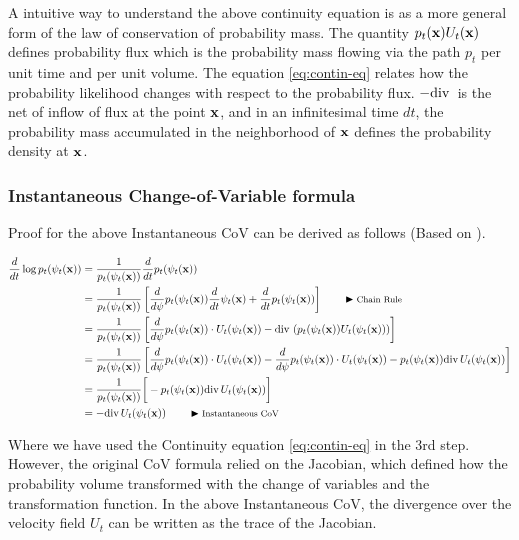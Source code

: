 \documentclass[a4paper, 11pt]{article}
\begin{document}
A intuitive way to understand the above continuity equation is as a more general form of the law of conservation of probability mass. The quantity $p_t(\mbox{$\mbox{$\mathbf{x}$}$})U_t(\mbox{$\mbox{$\mathbf{x}$}$})$ defines probability flux which is the probability mass flowing via the path $p_t$ per unit time and per unit volume. The equation \eqref{eq:contin-eq} relates how the probability likelihood changes with respect to the probability flux. $- \text{div}\,$ is the net of inflow of flux at the point $\mbox{$\mbox{$\mathbf{x}$}$}$, and in an infinitesimal time $dt$, the probability mass accumulated in the neighborhood of $\mbox{$\mbox{$\mathbf{x}$}$}$ defines the probability density at $\mbox{$\mbox{$\mathbf{x}$}$}$.
 

\subsubsection{Instantaneous Change-of-Variable formula}

Proof for the above Instantaneous CoV can be derived as follows (Based on \cite{mathieu2020riemannian}).

\begin{align}
    \frac{d}{dt} \log p_t(\psi_t(\mbox{$\mbox{$\mathbf{x}$}$})) &=  \frac{1}{p_t(\psi_t(\mbox{$\mbox{$\mathbf{x}$}$}))}\frac{d}{dt}p_t(\psi_t(\mbox{$\mbox{$\mathbf{x}$}$})) \\
    &=  \frac{1}{p_t(\psi_t(\mbox{$\mbox{$\mathbf{x}$}$}))}\left [\frac{d}{d\psi}p_t(\psi_t(\mbox{$\mbox{$\mathbf{x}$}$})) \frac{d}{dt}\psi_t(\mbox{$\mbox{$\mathbf{x}$}$}) + \frac{d}{dt}p_t(\psi_t(\mbox{$\mbox{$\mathbf{x}$}$})) \right ]  \qquad \blacktriangleright\text{\footnotesize Chain Rule} \\
    &= \frac{1}{p_t(\psi_t(\mbox{$\mbox{$\mathbf{x}$}$}))} \left [\frac{d}{d\psi}p_t(\psi_t(\mbox{$\mbox{$\mathbf{x}$}$})) \cdot U_t(\psi_t(\mbox{$\mbox{$\mathbf{x}$}$})) - \text{div}\, \left (p_t(\psi_t(\mbox{$\mbox{$\mathbf{x}$}$})) U_t(\psi_t(\mbox{$\mbox{$\mathbf{x}$}$})) \right ) \right ] \\
    &= \frac{1}{p_t(\psi_t(\mbox{$\mbox{$\mathbf{x}$}$}))} \left [\frac{d}{d\psi}p_t(\psi_t(\mbox{$\mbox{$\mathbf{x}$}$})) \cdot U_t(\psi_t(\mbox{$\mbox{$\mathbf{x}$}$})) - \frac{d}{d\psi}p_t(\psi_t(\mbox{$\mbox{$\mathbf{x}$}$})) \cdot U_t(\psi_t(\mbox{$\mbox{$\mathbf{x}$}$})) - p_t(\psi_t(\mbox{$\mbox{$\mathbf{x}$}$})) \text{div}\, U_t(\psi_t(\mbox{$\mbox{$\mathbf{x}$}$}))  \right ] \\
    &= \frac{1}{p_t(\psi_t(\mbox{$\mbox{$\mathbf{x}$}$}))} \bigg [- p_t(\psi_t(\mbox{$\mbox{$\mathbf{x}$}$})) \text{div}\, U_t(\psi_t(\mbox{$\mbox{$\mathbf{x}$}$}))  \bigg ] \\
    &= - \text{div}\, U_t(\psi_t(\mbox{$\mbox{$\mathbf{x}$}$})) \qquad \blacktriangleright\text{\footnotesize Instantaneous CoV} \label{eq:instant-cov}
\end{align}  

Where we have used the Continuity equation \eqref{eq:contin-eq} in the 3rd step. However, the original CoV formula relied on the Jacobian, which defined how the probability volume transformed with the change of variables and the transformation function. In the above Instantaneous CoV, the divergence over the velocity field $U_t$ can be written as the trace of the Jacobian.
\end{document}
